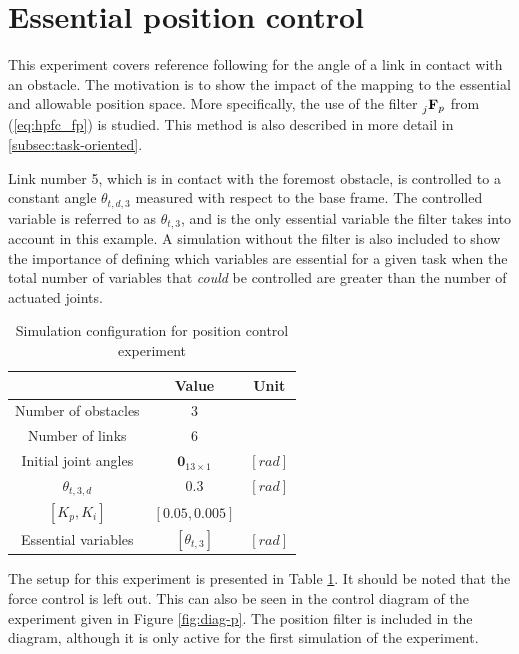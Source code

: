 \section{Essential position control}\label{sec:ess-pos}

This experiment covers reference following for the angle of a link in contact with an obstacle. The motivation is to show the impact of the mapping to the essential and allowable position space. More specifically, the use of the filter $\prescript{}{j}{\mathbf{F}}_{p}$ from (\ref{eq:hpfc_fp}) is studied. This method is also described in more detail in \ref{subsec:task-oriented}.

Link number 5, which is in contact with the foremost obstacle, is controlled to a constant angle $\theta_{t,d,3}$ measured with respect to the base frame. The controlled variable is referred to as $\theta_{t,3}$, and is the only essential variable the filter takes into account in this example. A simulation without the filter is also included to show the importance of defining which variables are essential for a given task when the total number of variables that \textit{could} be controlled are greater than the number of actuated joints.

\begin{table}[h!]
    \centering
    \begin{tabular}{|c|c|c|}
        \hline
        & \textbf{Value} & \textbf{Unit}\\
        \hline \hline
        Number of obstacles & $3$ & \\
        Number of links & $6$ & \\
        Initial joint angles & $\mathbf{0}_{13 \times 1}$ & $[rad]$ \\
        $\theta_{t,3,d}$ & $0.3$ & $[rad]$ \\
        $[K_p, K_i]$ & $[0.05, 0.005]$ &\\
        Essential variables & $[\theta_{t,3}]$ & $[rad]$ \\
        \hline
    \end{tabular}
    \caption{Simulation configuration for position control experiment}
    \label{tab:exp_single_pos}
\end{table}

The setup for this experiment is presented in Table \ref{tab:exp_single_pos}. It should be noted that the force control is left out. This can also be seen in the control diagram of the experiment given in Figure \ref{fig:diag-p}. The position filter is included in the diagram, although it is only active for the first simulation of the experiment.


